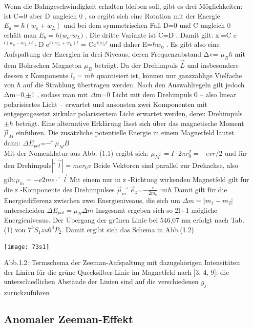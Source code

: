 \documentclass[10pt,a4paper]{article}
\begin{document}
Wenn die Bahngeschwindigkeit erhalten bleiben soll,  gibt es drei Möglichkeiten: ist C=0 aber D ungleich 0 , so ergibt sich eine Rotation mit der Energie $E_{a}=\hbar (w_{o}+w_{L})$ und bei dem symmetrischen Fall D=0 und C ungleich 0 erhält man $E_{b}=\hbar(w_{o}$-$w_{L})$ . Die dritte Variante ist C=D . Damit gilt:  x'=C e$^{i(w_{o}-w_{L})t}$+D e$^{i(w_{o}+w_{L})t}$ = Ce$^{i(w_{o}t}$ und daher E=$\hbar w_{0}$ . Es gibt also eine Aufspaltung der Energien in drei Niveaus, deren Frequenzabstand Δv=
$\mu_{B} \hbar$ mit dem 
Bohrschen Magneton $\mu_B$  beträgt. Da der Drehimpuls ⃗$\overrightarrow{L}$ und insbesondere dessen z Komponente $l_z=m\hbar$  quantisiert ist, können nur ganzzahlige Vielfache von $\hbar$  auf die Strahlung übertragen werden. Nach den Auswahlregeln gilt jedoch Δm=0,$\pm$1 , sodass man mit $\Delta$m=0 Licht mit dem Drehimpuls 0 – also linear polarisiertes Licht – erwartet und ansonsten zwei Komponenten mit entgegengesetzt zirkular polarisiertem Licht erwartet werden, deren Drehimpuls $\pm\hbar$  beträgt. Eine alternative Erklärung lässt sich über das magnetische Moment ⃗$\overrightarrow{\mu}_M$  einführen. Die zusätzliche potentielle Energie in einem Magnetfeld lautet dann: $\Delta E_{pot}$=−$ ⃗\mu_M B$\\


Mit der Nomenklatur aus Abb. (1.1) ergibt sich: $\mu_M|=I⋅2\pi r_0^2=−evr/2$ und für den Drehimpuls$ |⃗\overrightarrow{l}|=mer_0v$ Beide Vektoren sind parallel zur Drehachse, also gilt:$\mu_m=− e 2me ⋅⃗\overrightarrow{l}$ Mit einem nur in z -Richtung wirkenden Magnetfeld gilt für die z -Komponente des Drehimpulses ⃗$\overrightarrow{\mu}_m⃗\overrightarrow{e}_z$=−$\frac{e}{2m_e}$ ⋅m$\hbar$ Damit gilt für die Energiedifferenz zwischen zwei Energieniveaus, die sich um $\Delta m=|m_1-m_2|$ unterscheiden  $\Delta E_{pot}=\mu_B\Delta m$ Insgesamt ergeben sich so 2l+1 mögliche Energieniveaus. Der Übergang der grünen Linie bei 546,07 nm erfolgt nach Tab.(1) von $7^3S_1  zu 6^3P_2$. Damit ergibt sich das Schema in Abb.(1.2)

\texttt{[image: 73s1]}

Abb.1.2: Termschema der Zeeman-Aufspaltung mit dazugehörigen Intensitäten der Linien für die grüne Quecksilber-Linie im Magnetfeld nach [3, 4, 9]; die unterschiedlichen Abstände der Linien sind auf die verschiedenen $g_j$ zurückzuführen

\subsection {Anomaler Zeeman-Effekt}
\end{document}
